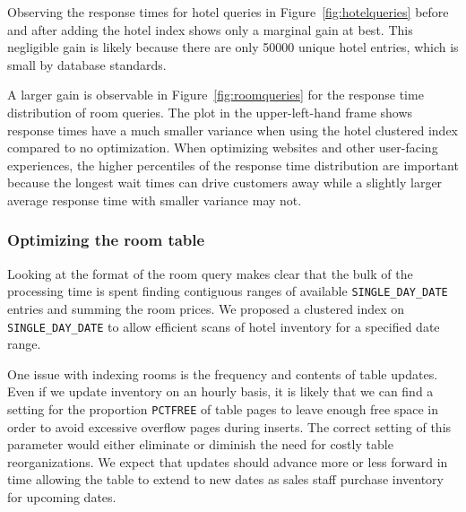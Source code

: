 \documentclass[letterpaper]{article}%
\begin{document}
Observing the response times for hotel queries in Figure~\ref{fig:hotelqueries}
before and after adding the hotel index shows only a marginal gain at best.
This negligible gain is likely because there are only 50000 unique hotel
entries, which is small by database standards.

A larger gain is observable in Figure~\ref{fig:roomqueries} for the response
time distribution of room queries. The plot in the upper-left-hand frame shows
response times have a much smaller variance when using the hotel clustered
index compared to no optimization. When optimizing websites and other
user-facing experiences, the higher percentiles of the response time
distribution are important because the longest wait times can drive customers
away while a slightly larger average response time with smaller variance may
not.

\subsubsection{Optimizing the room table}

Looking at the format of the room query makes clear that the bulk of the
processing time is spent finding contiguous ranges of available
\texttt{SINGLE\_DAY\_DATE} entries and summing the room prices. We proposed a
clustered index on \texttt{SINGLE\_DAY\_DATE} to allow efficient scans of hotel
inventory for a specified date range.

One issue with indexing rooms is the frequency and contents of table updates.
Even if we update inventory on an hourly basis, it is likely that we can find a
setting for the proportion \texttt{PCTFREE} of table pages to leave enough free
space in order to avoid excessive overflow pages during inserts. The correct
setting of this parameter would either eliminate or diminish the need for
costly table reorganizations. We expect that updates should advance more or
less forward in time allowing the table to extend to new dates as sales staff
purchase inventory for upcoming dates.
\end{document}

